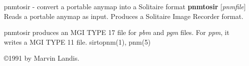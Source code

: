 %

\newpage
%

pnmtosir - convert a portable anymap into a Solitaire format
{\bf pnmtosir}
{\rm [}{\it pnmfile}{\rm ]}
Reads a portable anymap as input.
Produces a Solitaire Image Recorder format.
\par
pnmtosir produces an MGI TYPE 17 file for
{\it pbm}
and
{\it pgm}
files.
For
{\it ppm}{\rm ,}
it writes a MGI TYPE 11 file.
sirtopnm(1), pnm(5)

\copyright 1991 by Marvin Landis.

%
 
%

\newpage
%

